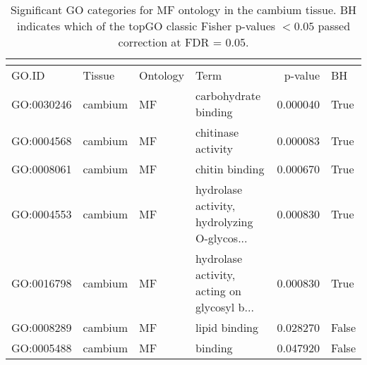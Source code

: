 \begin{longtable}{llllrl}
\caption{Significant GO categories for MF ontology in the cambium tissue. BH indicates which of the topGO classic Fisher p-values $< 0.05$ passed correction at FDR = 0.05.}\\
\label{tab:go-cambium-MF}\\
\toprule
GO.ID & Tissue & Ontology & Term & p-value & BH \\
\midrule
GO:0030246 & cambium & MF &   carbohydrate binding  & 0.000040 &   True \\
GO:0004568 & cambium & MF &   chitinase activity  & 0.000083 &   True \\
GO:0008061 & cambium & MF &   chitin binding  & 0.000670 &   True \\
GO:0004553 & cambium & MF &   hydrolase activity, hydrolyzing O-glycos...  & 0.000830 &   True \\
GO:0016798 & cambium & MF &   hydrolase activity, acting on glycosyl b...  & 0.000830 &   True \\
GO:0008289 & cambium & MF &   lipid binding  & 0.028270 &   False \\
GO:0005488 & cambium & MF &   binding  & 0.047920 &   False \\
\bottomrule
\end{longtable}
